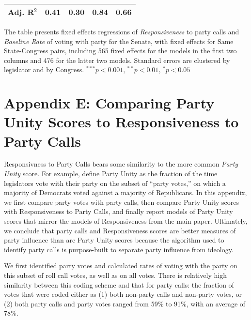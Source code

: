 \documentclass[12pt]{article}
\begin{document}
\begin{table}[!htbp]
\begin{threeparttable}
\begin{tabular}{l c c c c }
Adj. R$^2$                        & 0.41        & 0.30     & 0.84        & 0.66         \\
\hline
\end{tabular}
\begin{tablenotes}
   \item
   The table presents fixed effects regressions of \textit{Responsiveness} to
   party calls and \textit {Baseline Rate} of voting with party for the Senate,
   with fixed effects for Same State-Congress pairs, including 565 fixed
   effects for the models in the first two columns and 476 for the latter two
   models.
   Standard errors are clustered by legislator and by Congress.
   $^{***}p<0.001$, $^{**}p<0.01$, $^*p<0.05$
 \end{tablenotes}
\end{threeparttable}
\end{table}

\clearpage


\section*{Appendix E: Comparing Party Unity Scores to Responsiveness to
Party Calls}
%


Responsivness to Party Calls bears some similarity to the more common
\emph{Party Unity} score.
For example, \cite{Carson:2010} define Party Unity as the fraction of the time
legislators vote with their party on the subset of ``party votes,'' on which a
majority of Democrats voted against a majority of Republicans.
In this appendix, we first compare party votes with party calls, then compare
Party Unity scores with Responsiveness to Party Calls, and finally report
models of Party Unity scores that mirror the models of Responsiveness from the
main paper.
Ultimately, we conclude that party calls and Responsiveness scores are
better measures of party influence than are Party Unity scores because the
algorithm used to identify party calls is purpose-built to separate party
influence from ideology.

We first identified party votes and calculated rates of voting with the party
on this subset of roll call votes, as well as on all votes.
There is relatively high similarity between this coding scheme and that for
party calls: the fraction of votes that were coded either as (1) both non-party
calls and non-party votes, or (2) both party calls and party votes ranged from
59\% to 91\%, with an average of 78\%.
\end{document}
